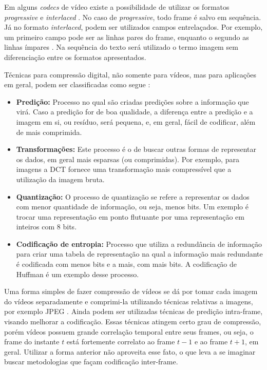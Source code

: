 \documentclass[cic,tc]{iiufrgs}
\begin{document}
Em alguns \emph{codecs} de vídeo existe a possibilidade de utilizar os formatos
\emph{progressive} e \emph{interlaced} \cite{SullivanH264}.
No caso de \emph{progressive}, todo frame é salvo em sequência.
Já no formato \emph{interlaced}, podem ser utilizados campos entrelaçados.
Por exemplo, um primeiro campo pode ser as linhas pares do frame, enquanto o segundo
as linhas ímpares \cite{SullivanH264}.
Na sequência do texto será utilizado o termo imagem sem diferenciação entre os 
formatos apresentados.

Técnicas para compressão digital, não somente para vídeos, mas para aplicações em geral,
podem ser classificadas como segue \cite{SullivanH264}:
\begin{itemize}
    \item \textbf{Predição:} Processo no qual são criadas predições sobre a informação 
    que virá. Caso a predição for de boa qualidade, a diferença entre a predição e a 
    imagem em si, ou resíduo, será pequena, e, em geral, fácil de codificar, além de mais
    comprimida.
    \item \textbf{Transformações:} Este processo é o de buscar outras formas de representar
    os dados, em geral mais esparsas (ou comprimidas). Por exemplo, para imagens a DCT 
    fornece uma transformação mais compressível que a utilização da imagem bruta.
    \item \textbf{Quantização:} O processo de quantização se refere a representar os dados
    com menor quantidade de informação, ou seja, menos bits. Um exemplo é trocar uma representação 
    em ponto flutuante por uma representação em inteiros com 8 bits.
    \item \textbf{Codificação de entropia:} Processo que utiliza a redundância de informação para 
    criar uma tabela de representação na qual a informação mais redundante é codificada
    com menos bits e a mais, com mais bits. A codificação de Huffman é um exemplo desse processo.
\end{itemize}

Uma forma simples de fazer compressão de vídeos se dá por tomar cada imagem do vídeos
separadamente e comprimi-la utilizando técnicas relativas a imagens, por exemplo JPEG \cite{SullivanH264}.
Ainda podem ser utilizadas técnicas de predição intra-frame, visando melhorar a codificação.
Essas técnicas atingem certo grau de compressão, porém vídeos possuem grande correlação temporal
entre seus frames, ou seja, o frame do instante $t$ está fortemente correlato ao frame $t-1$ e
ao frame $t+1$, em geral.
Utilizar a forma anterior não aproveita esse fato, o que leva a se imaginar buscar metodologias
que façam codificação inter-frame.
\end{document}
